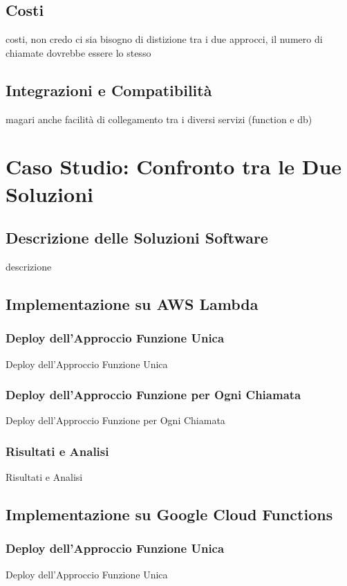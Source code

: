 \documentclass[12pt,a4paper,twoside]{book}
\begin{document}
\section{Costi}
costi, non credo ci sia bisogno di distizione tra i due approcci, il numero di chiamate dovrebbe essere lo stesso

\section{Integrazioni e Compatibilità}
magari anche facilità di collegamento tra i diversi servizi (function e db)

\chapter{Caso Studio: Confronto tra le Due Soluzioni}
\section{Descrizione delle Soluzioni Software}
descrizione

\section{Implementazione su AWS Lambda}
\subsection{Deploy dell’Approccio Funzione Unica}
Deploy dell’Approccio Funzione Unica

\subsection{Deploy dell’Approccio Funzione per Ogni Chiamata}
Deploy dell’Approccio Funzione per Ogni Chiamata

\subsection{Risultati e Analisi}
Risultati e Analisi

\section{Implementazione su Google Cloud Functions}
\subsection{Deploy dell’Approccio Funzione Unica}
Deploy dell’Approccio Funzione Unica
\end{document}
